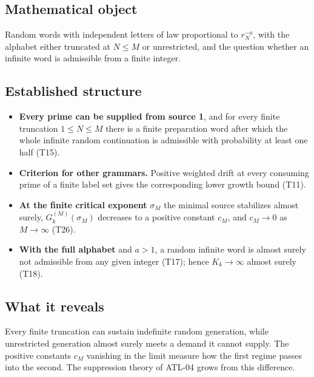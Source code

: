 \documentclass[
  11pt,
]{article}
\providecommand{\tightlist}{%
  \setlength{\itemsep}{0pt}\setlength{\parskip}{0pt}}
\begin{document}
\hypertarget{mathematical-object-1}{%
\subsection{Mathematical object}\label{mathematical-object-1}}

Random words with independent letters of law proportional to
\(r_N^{-a}\), with the alphabet either truncated at \(N\le M\) or
unrestricted, and the question whether an infinite word is admissible
from a finite integer.

\hypertarget{established-structure-1}{%
\subsection{Established structure}\label{established-structure-1}}

\begin{itemize}
\tightlist
\item
  \textbf{Every prime can be supplied from source 1}, and for every
  finite truncation \(1\le N\le M\) there is a finite preparation word
  after which the whole infinite random continuation is admissible with
  probability at least one half (T15).
\item
  \textbf{Criterion for other grammars.} Positive weighted drift at
  every consuming prime of a finite label set gives the corresponding
  lower growth bound (T11).
\item
  \textbf{At the finite critical exponent} \(\sigma_M\) the minimal
  source stabilizes almost surely, \(G_k^{(M)}(\sigma_M)\) decreases to
  a positive constant \(c_M\), and \(c_M\to0\) as \(M\to\infty\) (T26).
\item
  \textbf{With the full alphabet} and \(a>1\), a random infinite word is
  almost surely not admissible from any given integer (T17); hence
  \(K_k\to\infty\) almost surely (T18).
\end{itemize}

\hypertarget{what-it-reveals-1}{%
\subsection{What it reveals}\label{what-it-reveals-1}}

Every finite truncation can sustain indefinite random generation, while
unrestricted generation almost surely meets a demand it cannot supply.
The positive constants \(c_M\) vanishing in the limit measure how the
first regime passes into the second. The suppression theory of ATL-04
grows from this difference.
\end{document}
